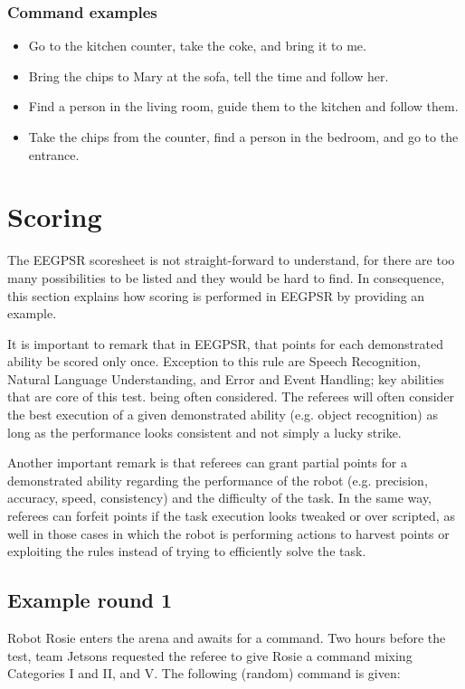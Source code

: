 \subsubsection{Command examples}
\begin{itemize}
	\item Go to the kitchen counter, take the coke, and bring it to me.
	\item Bring the chips to Mary at the sofa, tell the time and follow her.
	\item Find a person in the living room, guide them to the kitchen and follow them.
	\item Take the chips from the counter, find a person in the bedroom, and go to the entrance.
\end{itemize}



\section{Scoring}
The EEGPSR scoresheet is not straight-forward to understand, for there are too many possibilities to be listed and they would be hard to find. In consequence, this section explains how scoring is performed in EEGPSR by providing an example.

It is important to remark that in EEGPSR, that points for each demonstrated ability be scored only once. Exception to this rule are Speech Recognition, Natural Language Understanding, and Error and Event Handling; key abilities that are core of this test. being often considered. The referees will often consider the best execution of a given demonstrated ability (e.g. object recognition) as long as the performance looks consistent and not simply a lucky strike.

Another important remark is that referees can grant partial points for a demonstrated ability regarding the performance of the robot (e.g. precision, accuracy, speed, consistency) and the difficulty of the task. In the same way, referees can forfeit points if the task execution looks tweaked or over scripted, as well in those cases in which the robot is performing actions to harvest points or exploiting the rules instead of trying to efficiently solve the task.

\subsection{Example round 1}
Robot Rosie enters the arena and awaits for a command. Two hours before the test, team Jetsons requested the referee to give Rosie a command mixing Categories I and II, and V. The following (random) command is given:

